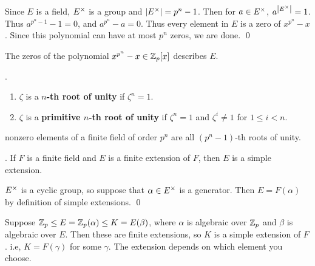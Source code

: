 \pf Since \(E\) is a field, \(E^\times\) is a group and \(\left| E^\times \right| = p^n - 1\). Then for \(a \in E^\times\), \(a^{\left| E^\times \right|} = 1\). Thus \(a^{p^n - 1} - 1 = 0\), and \(a^{p^n} - a = 0\). Thus every element in \(E\) is a zero of \(x^{p^n} - x\). Since this polynomial can have at most \(p^n\) zeros, we are done. \qed

The zeros of the polynomial \(x^{p^n} - x \in \mathbb{Z}_p[x]\) describes \(E\).

. 
\begin{enumerate}
    \item \(\zeta\) is a \textbf{\(n\)-th root of unity} if \(\zeta^n = 1\).
    \item \(\zeta\) is a \textbf{primitive \(n\)-th root of unity} if \(\zeta^n = 1\) and \(\zeta^i \neq 1\) for \(1 \leq i < n\).
\end{enumerate}

nonzero elements of a finite field of order \(p^n\) are all \((p^n - 1)\)-th roots of unity.

\cor. If \(F\) is a finite field and \(E\) is a finite extension of \(F\), then \(E\) is a simple extension.

\pf \(E^\times\) is a cyclic group, so suppose that \(\alpha \in E^\times\) is a generator. Then \(E = F(\alpha)\) by definition of simple extensions. \qed

Suppose \(\mathbb{Z}_p \leq E = \mathbb{Z}_p(\alpha) \leq K = E(\beta)\), where \(\alpha\) is algebraic over \(\mathbb{Z}_p\) and \(\beta\) is algebraic over \(E\). Then these are finite extensions, so \(K\) is a simple extension of \(F\). i.e, \(K = F(\gamma)\) for some \(\gamma\). The extension depends on which element you choose.

\pagebreak
